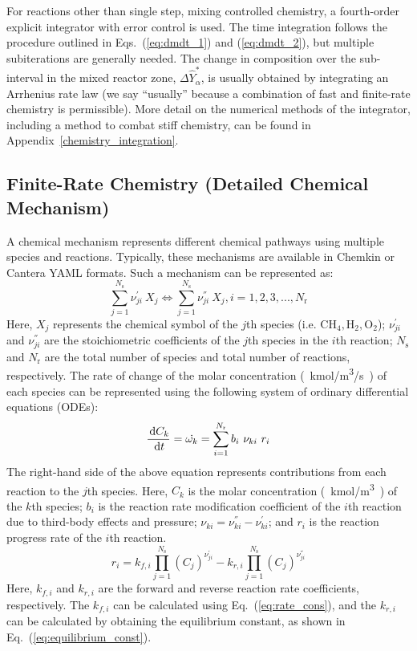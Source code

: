 For reactions other than single step, mixing controlled chemistry, a fourth-order explicit integrator with error control is used. The time integration follows the procedure outlined in Eqs.~(\ref{eq:dmdt_1}) and (\ref{eq:dmdt_2}), but multiple subiterations are generally needed. The change in composition over the sub-interval in the mixed reactor zone, $\Delta \hat{Y}_\alpha^*$, is usually obtained by integrating an Arrhenius rate law (we say ``usually'' because a combination of fast and finite-rate chemistry is permissible). More detail on the numerical methods of the integrator, including a method to combat stiff chemistry, can be found in Appendix~\ref{chemistry_integration}.


\subsection{Finite-Rate Chemistry (Detailed Chemical Mechanism)}
\label{detailed_chemistry_using_mechanism}
A chemical mechanism represents different chemical pathways using multiple species and reactions. Typically, these mechanisms are available in Chemkin or Cantera YAML formats. Such a mechanism can be represented as:
\begin{equation}\label{eq:chemistry_mechanism}
\sum_{j=1}^{N_{\text{s}}}{\nu}_{ji}^{'} \ X_j \Leftrightarrow \sum_{j=1}^{N_{\text{s}}}{\nu}_{ji}^{''} \ X_j, i=1,2,3,...,N_\text{r}
\end{equation}
Here, $X_j$ represents the chemical symbol of the $j$th species (i.e. $\mathrm{CH_4, H_2, O_2}$); ${\nu}_{ji}^{'}$ and ${\nu}_{ji}^{''}$ are the stoichiometric coefficients of the $j$th species in the $i$th reaction; ${N_{\text{s}}}$ and ${N_\text{r}}$ are the total number of species and total number of reactions, respectively.
The rate of change of the molar concentration \si{(kmol/m^3/s)} of each species can be represented using the following system of ordinary differential equations (ODEs):
\begin{equation}\label{eq:chemistry_ode_system}
\frac{\d C_k}{\d t} =  \dot{\omega_k} = \sum_{i=1}^{N_\text{r}} b_{i} \ \nu_{ki} \ r_i
\end{equation}
The right-hand side of the above equation represents contributions from each reaction to the $j$th species. Here, $C_k$ is the molar concentration \si {(kmol/m^3)} of the $k$th species; $b_i$ is the reaction rate modification coefficient of the $i$th reaction due to third-body effects and pressure; $\nu_{ki} = {\nu}_{ki}^{''} - {\nu}_{ki}^{'}$; and $r_i$ is the reaction progress rate of the $i$th reaction.
\begin{equation}\label{eq:reaction_progress_rate}
r_i =  k_{f,i} \prod_{j=1}^{N_{\text{s}}} (C_j)^{{\nu}_{ji}^{'}}  -  k_{r,i} \prod_{j=1}^{N_{\text{s}}} (C_j)^{{\nu}_{ji}^{''}}
\end{equation}
Here, $k_{f,i}$ and $k_{r,i}$ are the forward and reverse reaction rate coefficients, respectively. The $k_{f,i}$ can be calculated using Eq.~(\ref{eq:rate_cons}), and the $k_{r,i}$ can be calculated by obtaining the equilibrium constant, as shown in Eq.~(\ref{eq:equilibrium_const}).

